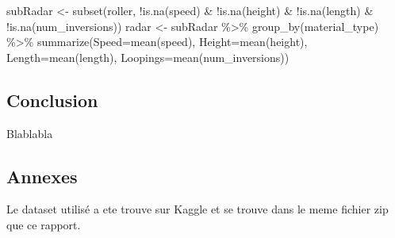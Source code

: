 \documentclass[
]{article}
\newenvironment{Shaded}{\begin{snugshade}}{\end{snugshade}}
\newcommand{\AttributeTok}[1]{\textcolor[rgb]{0.77,0.63,0.00}{#1}}
\newcommand{\FunctionTok}[1]{\textcolor[rgb]{0.00,0.00,0.00}{#1}}
\newcommand{\NormalTok}[1]{#1}
\newcommand{\OtherTok}[1]{\textcolor[rgb]{0.56,0.35,0.01}{#1}}
\newcommand{\SpecialCharTok}[1]{\textcolor[rgb]{0.00,0.00,0.00}{#1}}
\begin{document}
\begin{Shaded}
\begin{Highlighting}[]
\NormalTok{subRadar }\OtherTok{\textless{}{-}} \FunctionTok{subset}\NormalTok{(roller, }\SpecialCharTok{!}\FunctionTok{is.na}\NormalTok{(speed) }\SpecialCharTok{\&} \SpecialCharTok{!}\FunctionTok{is.na}\NormalTok{(height) }\SpecialCharTok{\&} \SpecialCharTok{!}\FunctionTok{is.na}\NormalTok{(length) }\SpecialCharTok{\&} \SpecialCharTok{!}\FunctionTok{is.na}\NormalTok{(num\_inversions))}
\NormalTok{radar }\OtherTok{\textless{}{-}}\NormalTok{ subRadar  }\SpecialCharTok{\%\textgreater{}\%} \FunctionTok{group\_by}\NormalTok{(material\_type) }\SpecialCharTok{\%\textgreater{}\%}
  \FunctionTok{summarize}\NormalTok{(}\AttributeTok{Speed=}\FunctionTok{mean}\NormalTok{(speed),}
            \AttributeTok{Height=}\FunctionTok{mean}\NormalTok{(height),}
            \AttributeTok{Length=}\FunctionTok{mean}\NormalTok{(length),}
            \AttributeTok{Loopings=}\FunctionTok{mean}\NormalTok{(num\_inversions))}
\end{Highlighting}
\end{Shaded}

\hypertarget{conclusion}{%
\subsection{Conclusion}\label{conclusion}}

Blablabla

\hypertarget{annexes}{%
\subsection{Annexes}\label{annexes}}

Le dataset utilisé a ete trouve sur Kaggle et se trouve dans le meme
fichier zip que ce rapport.
\end{document}
